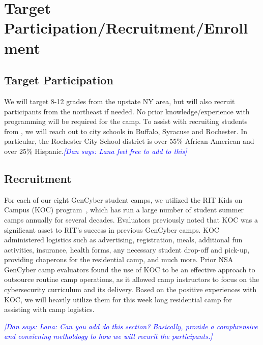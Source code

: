 \documentclass[12pt]{article}
\newcommand{\dan}[1]{\textcolor{blue}{{\it [Dan says: #1]}}}
\begin{document}
 





\section{Target Participation/Recruitment/Enrollment}


\subsection{Target Participation}
We will target 8-12 grades from the upstate NY area, but will also recruit participants from the northeast if needed. No prior knowledge/experience with programming will be required for the camp. To assist with recruiting students from , we will reach out to city schools in Buffalo, Syracuse and Rochester. In particular, the Rochester City School district is over 55\% African-American and over 25\% Hispanic.\dan{Lana feel free to add to this}


\subsection{Recruitment}


For each of our eight GenCyber student camps, we utilized the RIT Kids on Campus (KOC) program~\cite{KOC_URL}, which has run a large number of student summer camps annually for several decades. Evaluators previously noted that KOC was a significant asset to RIT's success in previous GenCyber camps. KOC administered logistics such as advertising, registration, meals, additional fun activities, insurance, health forms, any necessary student drop-off and pick-up, providing chaperons for the residential camp, and much more. Prior NSA GenCyber camp evaluators found the use of KOC to be an effective approach to outsource routine camp operations, as it allowed camp instructors to focus on the cybersecurity curriculum and its delivery. Based on the positive experiences with KOC, we will heavily utilize them for this week long residential camp for assisting with camp logistics. 

\dan{Lana: Can you add do this section? Basically, provide a comphrensive and convicning metholdogy to how we will recurit the participants.}


\end{document}
